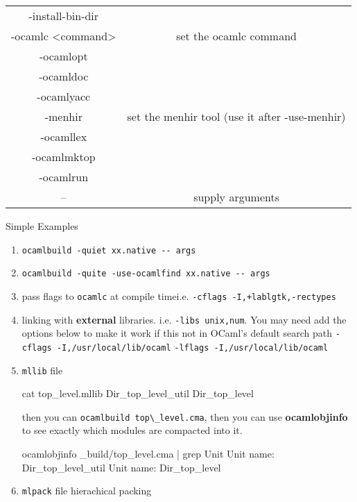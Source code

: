 \begin{spacing}{0.5}
\begin{tabular}{|c|c|}
-install-bin-dir & \\
-ocamlc <command> & set the ocamlc command \\
-ocamlopt  & \\
-ocamldoc & \\
-ocamlyacc & \\
-menhir & set the menhir tool (use it after -use-menhir)\\
-ocamllex & \\
-ocamlmktop & \\
-ocamlrun & \\
--  & supply arguments \\
\hline
  \end{tabular}
\end{spacing}


Simple Examples

\begin{enumerate}
\item \verb|ocamlbuild -quiet xx.native -- args|
\item \verb|ocamlbuild -quite -use-ocamlfind xx.native -- args|

\item   pass flags to \verb|ocamlc|  at compile timei.e.   
  \verb|-cflags -I,+lablgtk,-rectypes|

\item linking with \textbf{ external} libraries. i.e.
  \verb|-libs unix,num|.  You may need add the options below to make
  it work if this not in OCaml's default search path
  \verb|-cflags -I,/usr/local/lib/ocaml|
  \verb|-lflags -I,/usr/local/lib/ocaml|


\item \verb|mllib| file

  \begin{bluetext}
cat top_level.mllib    
Dir_top_level_util
Dir_top_level  
\end{bluetext}

then you can \verb|ocamlbuild top\_level.cma|, then you can use
\textbf{ocamlobjinfo} to see exactly which modules are compacted into
it.

\begin{bluetext}
ocamlobjinfo _build/top_level.cma | grep Unit  
Unit name: Dir_top_level_util
Unit name: Dir_top_level
\end{bluetext}

\item \verb|mlpack| file 
  hierachical packing 
\end{enumerate}

